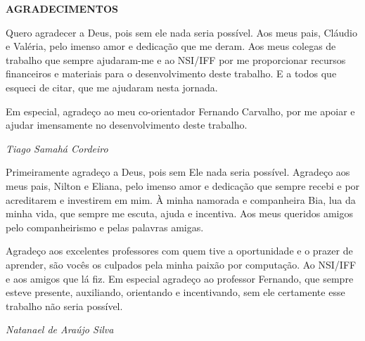 \begin{center}
\textbf{AGRADECIMENTOS}
\end{center}

Quero agradecer a Deus, pois sem ele nada seria possível. Aos meus pais, Cláudio e Valéria, pelo imenso amor e dedicação que me deram. Aos meus colegas de trabalho que sempre ajudaram-me e ao NSI/IFF por me proporcionar recursos financeiros e materiais para o desenvolvimento deste trabalho. E a todos que esqueci de citar, que me ajudaram nesta jornada.

Em especial, agradeço ao meu co-orientador Fernando Carvalho, por me apoiar e ajudar imensamente no desenvolvimento deste trabalho.

\begin{flushright}
  \textit{Tiago Samahá Cordeiro}
\end{flushright}

Primeiramente agradeço a Deus, pois sem Ele nada seria possível. Agradeço aos meus pais, Nilton e Eliana, pelo imenso amor e dedicação que sempre recebi e por acreditarem e investirem em mim. À minha namorada e companheira Bia, lua da minha vida, que sempre me escuta, ajuda e incentiva. Aos meus queridos amigos pelo companheirismo e pelas palavras amigas.

Agradeço aos excelentes professores com quem tive a oportunidade e o prazer de aprender, são vocês os culpados pela minha paixão por computação. Ao NSI/IFF e aos amigos que lá fiz. Em especial agradeço ao professor Fernando, que sempre esteve presente, auxiliando, orientando e incentivando, sem ele certamente esse trabalho não seria possível.

\begin{flushright}
  \textit{Natanael de Araújo Silva}
\end{flushright}